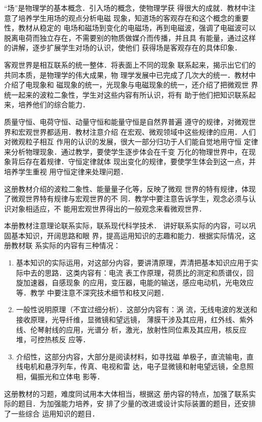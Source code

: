 “场”是物理学的基本概念．引入场的概念，使物理学获
得很大的成就．教材中注意了培养学生用场的观点分析电磁
现象，知道场的客观存在和这个概念的重要性，教材从稳定的
电场和磁场到变化的电磁场，再到电磁波，强调了电磁波可以
脱离电荷而独立存在，不需要别的物质做媒介而传播，并且具
有能量，通过这样的讲解，逐步扩展学生对场的认识，使他们
获得场是客观存在的具体印象．

客观世界是相互联系的统一整体．将表面上不同的现象
联系起来，揭示出它们的共同本质，是物理学的伟大成果，物
理学发展中已完成了几次大的统一．教材中介绍了电现象和
磁现象的统一，光现象与电磁现象的统一，还介绍了把微观世
界统一起来的波粒二象性，学生对这些内容有所认识，将有
助于他们把知识联系起来，培养他们的综合能力．

质量守恒、电荷守恒、动量守恒和能量守恒是自然界普遍
遵守的规律，对微观世界和宏观世界都适用．教材注意介绍
在宏观、微观领域中这些规律的应用．人们对微观粒子相互
作用的认识的发展，很大一部分归功于人们能自觉地用守恒
定律来分析物理现象．通过教学，要使学生逐步体会在千变
万化的物理世界中，在现象背后存在着规律．守恒定律就体
现出变化的规律，要使学生体会到这一点，并培养学生重视
用守恒定律来处理问题．

这册教材介绍的波粒二象性、能量量子化等，反映了微观
世界的特有规律，体现了微观世界特有规律与宏观世界的不
同．教学中要注意告诉学生，观念必须与认识对象相适应，不
能用宏观世界得出的一般观念来看微观世界．

本册教材注意理论联系实际，联系现代科学技术．
讲好联系实际的内容，可以巩固基本知识，开阔思路和眼
界，提高运用知识的志趣和能力．根据实际情况，这册教材联
系实际的内容有三种情况：
\begin{enumerate}
    \item 基本知识的实际运用，对这部分内容，要讲清原理，弄清把基本知识应用于实际中去的思路．这类内容有：电流
    表工作原理，荷质比的测定和质谱仪，回旋加速器，自感现象
    的应用，变压器，电能的输送，感应电动机，光电效应等．教学
    中要注意不深究技术细节和枝叉问题．
    \item 一般性说明原理（不宜过细分析）．这部分内容有：涡
    流，无线电波的发送和接收原理，光导纤维，显微镜和望远镜，
    薄膜干涉及其应用，红外线、紫外线、伦琴射线的应用，光谱分
    析，激光，放射性同位素及其应用，核反应堆，可控热核反
    应等．
    \item 介绍性，这部分内容，大部分是阅读材料，如寻找磁
    单极子，直流输电，直线电机和悬浮列车，传真、电视和雷
    达，电子显微镜和射电望远镜，全息照相，偏振光和立体电
    影等．
\end{enumerate}

这册教材的习题，难度同试用本大体相当，根据这
册内容的特点，加强了联系实际的题目．为加强能力培养，安
排了少量的改进或设计实际装置的题目，还安排了一些综合
运用知识的题目．

